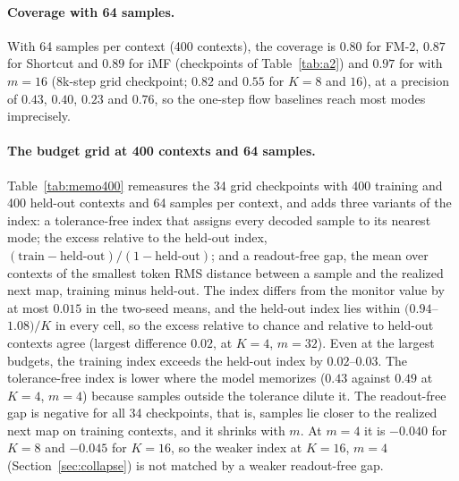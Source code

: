 \paragraph{Coverage with 64 samples.} With 64 samples per context (400 contexts), the coverage is $0.80$ for FM-2, $0.87$ for Shortcut and $0.89$ for iMF (checkpoints of Table~\ref{tab:a2}) and $0.97$ for \imlewm{} with $m{=}16$ (8k-step grid checkpoint; $0.82$ and $0.55$ for $K = 8$ and $16$), at a precision of $0.43$, $0.40$, $0.23$ and $0.76$, so the one-step flow baselines reach most modes imprecisely.

\paragraph{The budget grid at 400 contexts and 64 samples.} Table~\ref{tab:memo400} remeasures the 34 grid checkpoints with 400 training and 400 held-out contexts and 64 samples per context, and adds three variants of the index: a tolerance-free index that assigns every decoded sample to its nearest mode; the excess relative to the held-out index, $(\text{train} - \text{held-out})/(1 - \text{held-out})$; and a readout-free gap, the mean over contexts of the smallest token RMS distance between a sample and the realized next map, training minus held-out. The index differs from the monitor value by at most $0.015$ in the two-seed means, and the held-out index lies within $(0.94$--$1.08)/K$ in every cell, so the excess relative to chance and relative to held-out contexts agree (largest difference $0.02$, at $K{=}4$, $m{=}32$). Even at the largest budgets, the training index exceeds the held-out index by $0.02$--$0.03$. The tolerance-free index is lower where the model memorizes ($0.43$ against $0.49$ at $K{=}4$, $m{=}4$) because samples outside the tolerance dilute it. The readout-free gap is negative for all 34 checkpoints, that is, samples lie closer to the realized next map on training contexts, and it shrinks with $m$. At $m{=}4$ it is $-0.040$ for $K{=}8$ and $-0.045$ for $K{=}16$, so the weaker index at $K{=}16$, $m{=}4$ (Section~\ref{sec:collapse}) is not matched by a weaker readout-free gap.

